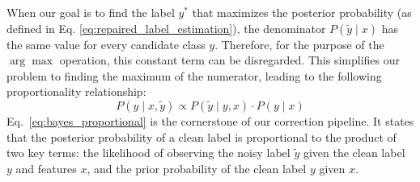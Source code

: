 When our goal is to find the label $y^*$ that maximizes the posterior probability (as defined in Eq. \ref{eq:repaired_label_estimation}), the denominator $P(\tilde{y} \mid x)$ has the same value for every candidate class $y$. Therefore, for the purpose of the $\arg\max$ operation, this constant term can be disregarded. This simplifies our problem to finding the maximum of the numerator, leading to the following proportionality relationship:
\begin{equation}
    P(y \mid x, \tilde{y}) \propto P(\tilde{y} \mid y, x) \cdot P(y \mid x)
    \label{eq:bayes_proportional}
\end{equation}
Eq.~\ref{eq:bayes_proportional} is the cornerstone of our correction pipeline. It states that the posterior probability of a clean label is proportional to the product of two key terms: the likelihood of observing the noisy label $\tilde{y}$ given the clean label $y$ and features $x$, and the prior probability of the clean label $y$ given $x$. 

